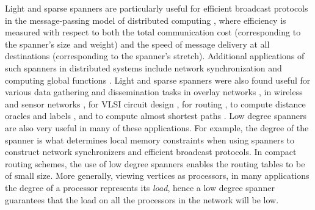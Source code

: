 \documentclass[11pt,letterpaper]{article}
\begin{document}
Light and sparse spanners are particularly useful for efficient broadcast protocols in the message-passing model of distributed computing \cite{ABP90,ABP91},
where efficiency is measured with respect to both the total communication cost (corresponding to the spanner's size and weight) and the speed of message delivery at all destinations (corresponding to the spanner's stretch).
Additional applications of such spanners in distributed systems include network synchronization and computing global functions \cite{Awerbuch85,PU89,ABP90,ABP91,Peleg00}. Light and sparse spanners were also found useful for various data gathering and dissemination tasks in overlay networks \cite{BKRCV02,VWFME03,KV01}, in wireless and sensor networks \cite{RW04,BDS04,SS10}, for VLSI circuit design \cite{CKRSW91,CKRSW292,CKRSW92,SCRS01},
for routing \cite{WCT02,PU89,PU89b,TZ01}, to compute distance oracles and labels \cite{Peleg00Prox,TZ01b,RTZ05}, and to compute almost shortest paths \cite{Coh98,RZ11,Elkin05,EZ06,FKMSZ05}. Low degree spanners are also very useful in many of these applications.
For example, the degree of the spanner is what determines local memory constraints when using
spanners to construct network synchronizers  and efficient broadcast protocols.
In compact routing schemes, the use of low degree spanners enables the routing tables to be of small size.
More generally, viewing vertices as processors, in many applications the degree of a processor
represents its \emph{load}, hence a low degree spanner guarantees that the load on all the processors in the network will be low.
\end{document}
